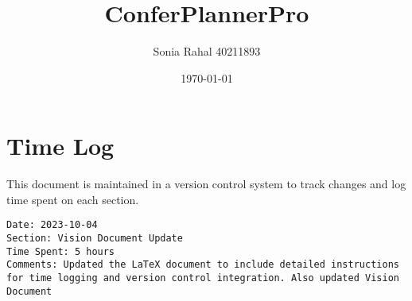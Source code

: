 \documentclass{article}
\begin{document}
\title{ConferPlannerPro}
\author{Sonia Rahal 40211893}
\date{\today}
\maketitle

\section{Time Log}
This document is maintained in a version control system to track changes and log time spent on each section.
\begin{verbatim}
Date: 2023-10-04
Section: Vision Document Update
Time Spent: 5 hours
Comments: Updated the LaTeX document to include detailed instructions for time logging and version control integration. Also updated Vision Document
\end{verbatim}

\end{document}
